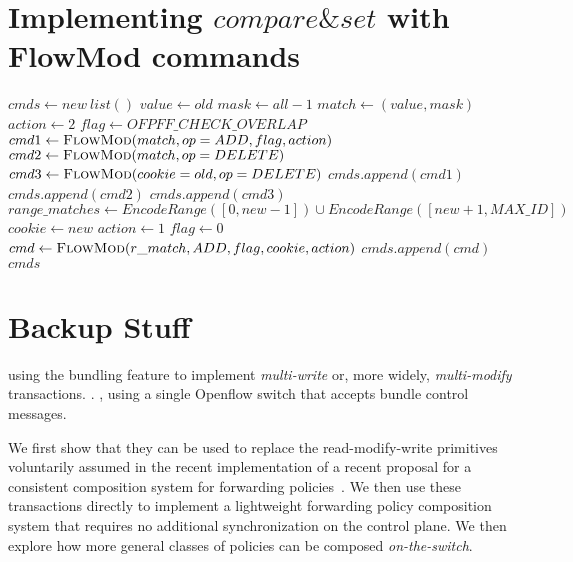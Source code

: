 \documentclass[conference]{sigcomm-alternate}
\newcommand{\concat}[0]{\oplus}
\begin{document}
\begin{appendix}

\section{Implementing $\textit{compare\&set}$ with FlowMod commands}
\begin{algorithm}[H]
    \caption{$\textit{compare\&set2}(old,new)$}
    \label{alg:cas2}
    \begin{algorithmic}[1]
			\State $cmds \gets new\ list()$
    		\State $value \gets  old$
    		\State $mask \gets  all-1$
    		\State $match \gets (value,mask)$
    		\State $action \gets 2$
    		\State $flag \gets OFPFF\_CHECK\_OVERLAP$
    		\State $cmd1\gets \textsc{FlowMod}(match, op = ADD, flag, action) $
    		\State $cmd2\gets \textsc{FlowMod}(match, op = DELETE) $
    		\State $cmd3\gets \textsc{FlowMod}(cookie = old, op = DELETE) $
    		\State $cmds.append(cmd1)$
    		\State $cmds.append(cmd2)$
    		\State $cmds.append(cmd3)$
    		\State $range\_matches \gets EncodeRange([0,new-1])\cup EncodeRange([new+1,MAX\_ID])$
    		    		\State $cookie \gets new$
    		    		\State $action \gets 1$
    		    		\State $flag \gets 0$
    		    		\State $cmd\gets \textsc{FlowMod}(r\_match, ADD, flag, cookie, action) $
    		    		\State $cmds.append(cmd)$
    		\EndFor
			\Return $cmds$
    \end{algorithmic}
\end{algorithm}

\section{Backup Stuff}

using the bundling feature to implement \emph{multi-write} or, more
widely, \emph{multi-modify} transactions. .
, using a single Openflow switch that accepts
bundle control messages.

We first show that they can be used to replace the read-modify-write
primitives voluntarily assumed in the recent implementation of a
recent proposal for a consistent composition system for forwarding policies~\cite{cpc}.
We then use these transactions directly to implement a lightweight
forwarding policy composition system that requires no additional
synchronization on the control plane.
We then explore how more general classes of policies can be composed
\emph{on-the-switch}.


\end{appendix}
\end{document}
